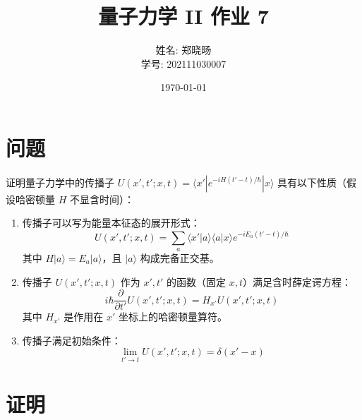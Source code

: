 \documentclass[12pt, a4paper]{article}
\begin{document}
\title{量子力学 II 作业 7}
\author{姓名: 郑晓旸 \\ 学号: 202111030007}
\date{ \today}
\maketitle %
\section*{问题}
证明量子力学中的传播子 \(U(x', t'; x, t) = \langle x' | e^{-iH(t'-t)/\hbar} | x \rangle\) 具有以下性质（假设哈密顿量 \(H\) 不显含时间）：
\begin{enumerate}
    \item 传播子可以写为能量本征态的展开形式：
    \[ U(x', t'; x, t) = \sum_a \langle x'|a\rangle\langle a|x\rangle e^{-iE_a(t'-t)/\hbar} \]
    其中 \(H|a\rangle = E_a|a\rangle\)，且 \(|a\rangle\) 构成完备正交基。
    \item 传播子 \(U(x', t'; x, t)\) 作为 \(x', t'\) 的函数（固定 \(x, t\)）满足含时薛定谔方程：
    \[ i\hbar \frac{\partial}{\partial t'} U(x', t'; x, t) = H_{x'} U(x', t'; x, t) \]
    其中 \(H_{x'}\) 是作用在 \(x'\) 坐标上的哈密顿量算符。
    \item 传播子满足初始条件：
    \[ \lim_{t' \to t} U(x', t'; x, t) = \delta(x' - x) \]
\end{enumerate}
\section*{证明}
\end{document}
